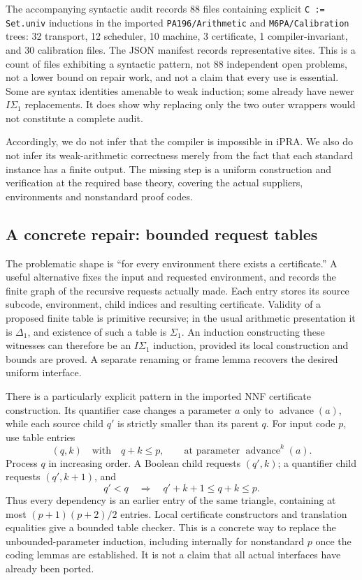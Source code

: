 The accompanying syntactic audit records 88 files containing explicit
\texttt{C := Set.univ} inductions in the imported
\texttt{PA196/Arithmetic} and \texttt{M6PA/Calibration} trees:
32 transport, 12 scheduler, 10 machine, 3 certificate, 1 compiler-invariant,
and 30 calibration files.  The JSON manifest records representative sites.
This is a count of files exhibiting a syntactic pattern, not 88 independent open problems,
not a lower bound on repair work, and not a claim that every use is
essential.  Some are syntax identities amenable to weak induction; some
already have newer $I\Sigma_1$ replacements.  It does show why replacing
only the two outer wrappers would not constitute a complete audit.

Accordingly, we do not infer that the compiler is impossible in iPRA.
We also do not infer its weak-arithmetic correctness merely from the fact
that each standard instance has a finite output.  The missing step is a
uniform construction and verification at the required base theory,
covering the actual suppliers, environments and nonstandard proof codes.

\subsection{A concrete repair: bounded request tables}
\label{ipra-request-tables}

The problematic shape is ``for every environment there exists a
certificate.''  A useful alternative fixes the input and requested
environment, and records the finite graph of the recursive requests
actually made.  Each entry stores its source subcode, environment, child
indices and resulting certificate.  Validity of a proposed finite table
is primitive recursive; in the usual arithmetic presentation it is
$\Delta_1$, and existence of such a table is $\Sigma_1$.  An induction
constructing these witnesses can therefore be an $I\Sigma_1$ induction,
provided its local construction and bounds are proved.  A separate
renaming or frame lemma recovers the desired uniform interface.

There is a particularly explicit pattern in the imported NNF certificate
construction.  Its quantifier case changes a parameter $a$ only to
$\operatorname{advance}(a)$, while each source child $q'$ is strictly
smaller than its parent $q$.  For input code $p$, use table entries
\[
 (q,k)\quad\text{with}\quad q+k\le p,
 \qquad\text{at parameter }\operatorname{advance}^{k}(a).
\]
Process $q$ in increasing order.  A Boolean child requests $(q',k)$;
a quantifier child requests $(q',k+1)$, and
\[
 q'<q\quad\Longrightarrow\quad q'+k+1\le q+k\le p.
\]
Thus every dependency is an earlier entry of the same triangle, containing
at most $(p+1)(p+2)/2$ entries.  Local certificate constructors and
translation equalities give a bounded table checker.  This is a concrete
way to replace the unbounded-parameter induction, including internally
for nonstandard $p$ once the coding lemmas are established.  It is not a
claim that all actual interfaces have already been ported.

